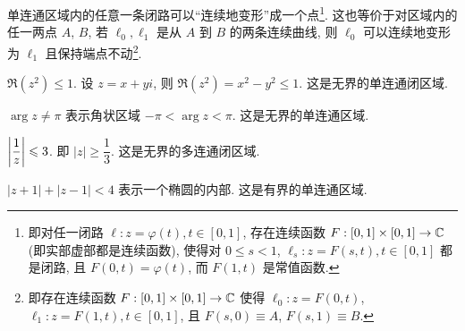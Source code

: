 单连通区域内的任意一条闭路可以``连续地变形''成一个点\footnote{%
  即对任一闭路 $\ell: z=\varphi(t),t\in[0,1]$, 存在连续函数 $F:[0,1]\times[0,1]\to {\mathbb{C}}$ (即实部虚部都是连续函数), 使得对 $0\le s<1$, $\ell_s: z=F(s,t),t\in[0,1]$
  都是闭路, 且 $F(0,t)=\varphi(t)$, 而 $F(1,t)$ 是常值函数.%
}. 这也等价于对区域内的任一两点 $A$, $B$, 若 $\ell_0,\ell_1$ 是从 $A$ 到 $B$ 的两条连续曲线, 则 $\ell_0$ 可以连续地变形为 $\ell_1$ 且保持端点不动\footnote{%
  即存在连续函数 $F:[0,1]\times[0,1]\to {\mathbb{C}}$ 使得
  $\ell_0: z=F(0,t)$, $\ell_1: z=F(1,t),t\in[0,1]$, 且 $F(s,0)\equiv A$, $F(s,1)\equiv B$.
}.

\begin{example}\delspace
  \begin{enumnopar}[(i)]
    \item $\Re(z^2)\le1$. 设 $z=x+yi$, 则 $\Re(z^2)=x^2-y^2\le1$. 这是无界的单连通闭区域.
    \item $\arg z\neq \pi$ 表示角状区域 $-\pi<\arg z<\pi$. 这是无界的单连通区域.
    \item $\left|\dfrac1z\right|\leqslant3$. 即 $|z|\ge\dfrac13$. 这是无界的多连通闭区域.
    \item $|z+1|+|z-1|<4$ 表示一个椭圆的内部. 这是有界的单连通区域.
  \end{enumnopar}
\end{example}

